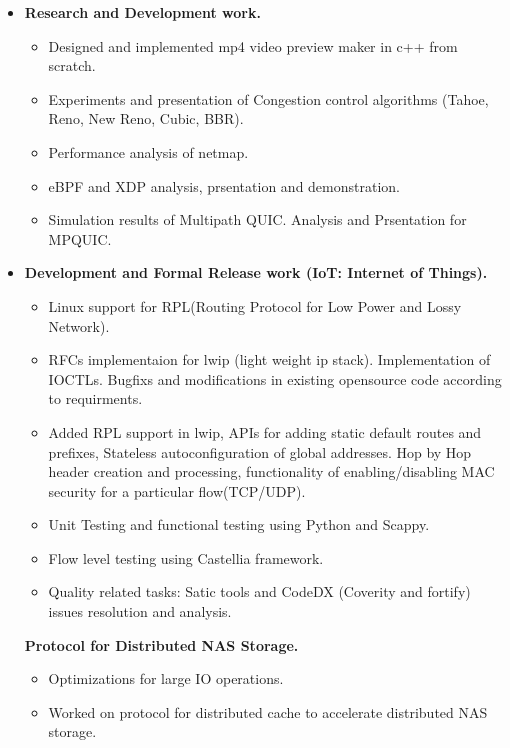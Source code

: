 \begin{itemize}
	\item \textbf{Research and Development work.}\\[-0.6cm]
	\begin{itemize}  	
		\item Designed and implemented mp4 video preview maker in c++ from scratch. \\[-0.5cm]
		\item Experiments and presentation of Congestion control algorithms (Tahoe, Reno, New Reno, Cubic, BBR).\\[-0.5cm]
		\item Performance analysis of netmap.\\[-0.5cm]
		\item eBPF and XDP analysis, prsentation and demonstration.\\[-0.5cm] 
		\item Simulation results of Multipath QUIC. Analysis and Prsentation for MPQUIC.\\[-0.5cm]
	\end{itemize}
	\item \textbf{Development and Formal Release work (IoT: Internet of Things).} \\[-0.6cm]
	\begin{itemize} 
	 \item Linux support for RPL(Routing Protocol for Low Power and Lossy Network).\\[-0.5cm]
	 \item RFCs implementaion for lwip (light weight ip stack). Implementation of IOCTLs. Bugfixs and modifications in existing opensource code according to requirments.\\[-0.5cm]
	 \item Added RPL support in lwip, APIs for adding static default routes and prefixes, Stateless autoconfiguration of global addresses. Hop by Hop header creation and processing, functionality of enabling/disabling MAC security for a particular flow(TCP/UDP).\\[-0.5cm]
	 \item Unit Testing and functional testing using Python and Scappy.\\[-0.5cm]
	 \item Flow level testing using Castellia framework.\\[-0.5cm]
	 \item Quality related tasks: Satic tools and CodeDX (Coverity and fortify) issues resolution and analysis.\\[-0.5cm]
	\end{itemize}
	\textbf{Protocol for Distributed NAS Storage.}
	\begin{itemize}
	\item Optimizations for large IO operations.
	\item Worked on protocol for distributed cache to accelerate distributed NAS storage.
	\end{itemize}
\end{itemize}
